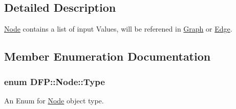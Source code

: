 \subsection{Detailed Description}
\hyperlink{class_d_f_p_1_1_node}{Node} contains a list of input Values, will be referened in \hyperlink{class_d_f_p_1_1_graph}{Graph} or \hyperlink{class_d_f_p_1_1_edge}{Edge}. 

\subsection{Member Enumeration Documentation}
\subsubsection[{\texorpdfstring{Type}{Type}}]{\setlength{\rightskip}{0pt plus 5cm}enum {\bf D\+F\+P\+::\+Node\+::\+Type}}\hypertarget{class_d_f_p_1_1_node_a31d945c7278c3587d6d28c76b0f1ae81}{}\label{class_d_f_p_1_1_node_a31d945c7278c3587d6d28c76b0f1ae81}


An Enum for \hyperlink{class_d_f_p_1_1_node}{Node} object type. 

